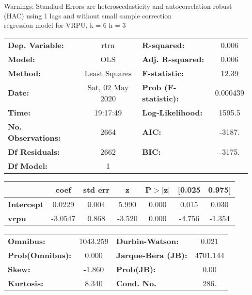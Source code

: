 Warnings: \newline
 [1] Standard Errors are heteroscedasticity and autocorrelation robust (HAC) using 1 lags and without small sample correction\\ 

regression model for VRPU, k = 6 h = 3\begin{center}
\begin{tabular}{lclc}
\toprule
\textbf{Dep. Variable:}    &       rtrn       & \textbf{  R-squared:         } &     0.006   \\
\textbf{Model:}            &       OLS        & \textbf{  Adj. R-squared:    } &     0.006   \\
\textbf{Method:}           &  Least Squares   & \textbf{  F-statistic:       } &     12.39   \\
\textbf{Date:}             & Sat, 02 May 2020 & \textbf{  Prob (F-statistic):} &  0.000439   \\
\textbf{Time:}             &     19:17:49     & \textbf{  Log-Likelihood:    } &    1595.5   \\
\textbf{No. Observations:} &        2664      & \textbf{  AIC:               } &    -3187.   \\
\textbf{Df Residuals:}     &        2662      & \textbf{  BIC:               } &    -3175.   \\
\textbf{Df Model:}         &           1      & \textbf{                     } &             \\
\bottomrule
\end{tabular}
\begin{tabular}{lcccccc}
                   & \textbf{coef} & \textbf{std err} & \textbf{z} & \textbf{P$> |$z$|$} & \textbf{[0.025} & \textbf{0.975]}  \\
\midrule
\textbf{Intercept} &       0.0229  &        0.004     &     5.990  &         0.000        &        0.015    &        0.030     \\
\textbf{vrpu}      &      -3.0547  &        0.868     &    -3.520  &         0.000        &       -4.756    &       -1.354     \\
\bottomrule
\end{tabular}
\begin{tabular}{lclc}
\textbf{Omnibus:}       & 1043.259 & \textbf{  Durbin-Watson:     } &    0.021  \\
\textbf{Prob(Omnibus):} &   0.000  & \textbf{  Jarque-Bera (JB):  } & 4701.144  \\
\textbf{Skew:}          &  -1.860  & \textbf{  Prob(JB):          } &     0.00  \\
\textbf{Kurtosis:}      &   8.340  & \textbf{  Cond. No.          } &     286.  \\
\bottomrule
\end{tabular}
\end{center}


